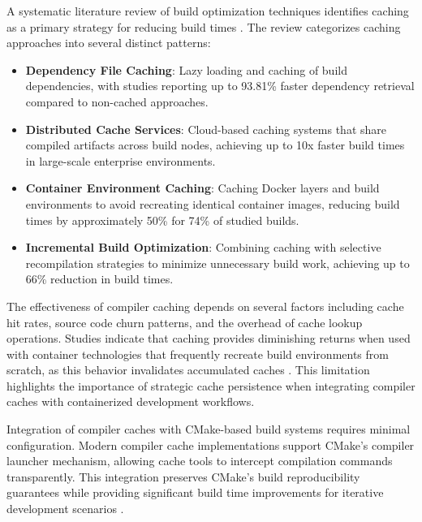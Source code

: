 \newpage
A systematic literature review of build optimization techniques identifies caching as a primary strategy for reducing build times \citep{aidassoBuildOptimizationSystematic2025}.
The review categorizes caching approaches into several distinct patterns:
\begin{itemize}
    \item \textbf{Dependency File Caching}: Lazy loading and caching of build dependencies, with studies reporting up to 93.81\% faster dependency retrieval compared to non-cached approaches.
    \item \textbf{Distributed Cache Services}: Cloud-based caching systems that share compiled artifacts across build nodes, achieving up to 10x faster build times in large-scale enterprise environments.
    \item \textbf{Container Environment Caching}: Caching Docker layers and build environments to avoid recreating identical container images, reducing build times by approximately 50\% for 74\% of studied builds.
    \item \textbf{Incremental Build Optimization}: Combining caching with selective recompilation strategies to minimize unnecessary build work, achieving up to 66\% reduction in build times.
\end{itemize}

The effectiveness of compiler caching depends on several factors including cache hit rates, source code churn patterns, and the overhead of cache lookup operations.
Studies indicate that caching provides diminishing returns when used with container technologies that frequently recreate build environments from scratch, as this behavior invalidates accumulated caches \citep{aidassoBuildOptimizationSystematic2025}.
This limitation highlights the importance of strategic cache persistence when integrating compiler caches with containerized development workflows.

Integration of compiler caches with CMake-based build systems requires minimal configuration.
Modern compiler cache implementations support CMake's compiler launcher mechanism, allowing cache tools to intercept compilation commands transparently.
This integration preserves CMake's build reproducibility guarantees while providing significant build time improvements for iterative development scenarios \citep{swidzinskiModernCMakeEffortlessly2024}.



